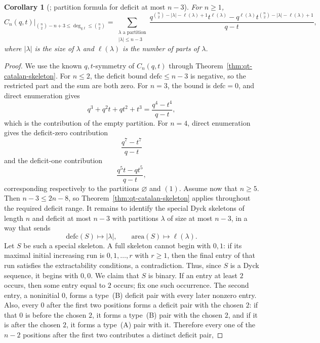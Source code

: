 \documentclass[11pt]{article}
\theoremstyle{plain}
\newtheorem{corollary}[theorem]{Corollary}
\theoremstyle{definition}
\theoremstyle{remark}
\newcommand{\area}{\mathrm{area}}
\newcommand{\defc}{\mathrm{defc}}
\begin{document}
\begin{corollary}[\cite{LeeLi2011}; partition formula for deficit at most \(n-3\)]
\label{cor:partition-formula}
For \(n\ge 1\),
\[
  \left.C_n(q,t)\right|_{\binom n2-n+3\le \deg_{q,t}\le \binom n2}
  =
  \sum_{\substack{\lambda\text{ a partition}\\ |\lambda|\le n-3}}
  \frac{q^{\binom n2-|\lambda|-\ell(\lambda)+1}t^{\ell(\lambda)}
        -q^{\ell(\lambda)}t^{\binom n2-|\lambda|-\ell(\lambda)+1}}{q-t},
\]
where \(|\lambda|\) is the size of \(\lambda\) and \(\ell(\lambda)\) is the
number of parts of \(\lambda\).
\end{corollary}
\begin{proof}
We use the known \(q,t\)-symmetry of \(C_n(q,t)\) through
Theorem~\ref{thm:qt-catalan-skeleton}.  For \(n\le 2\), the deficit bound
\(\defc\le n-3\) is negative, so the restricted part and the sum are both zero.
For \(n=3\), the bound is
\(\defc=0\), and direct enumeration gives
\[
  q^3+q^2t+qt^2+t^3=\frac{q^4-t^4}{q-t},
\]
which is the contribution of the empty partition.  For \(n=4\), direct
enumeration gives the deficit-zero contribution
\[
  \frac{q^7-t^7}{q-t}
\]
and the deficit-one contribution
\[
  \frac{q^5t-qt^5}{q-t},
\]
corresponding respectively to the partitions \(\varnothing\) and \((1)\).
Assume now that \(n\ge 5\).  Then \(n-3\le 2n-8\), so
Theorem~\ref{thm:qt-catalan-skeleton} applies throughout the required deficit
range.  It remains to identify the special Dyck skeletons of length \(n\) and
deficit at most \(n-3\) with partitions \(\lambda\) of size at most \(n-3\), in
a way that sends
\[
  \defc(S)\mapsto |\lambda|,
  \qquad
  \area(S)\mapsto \ell(\lambda).
\]
Let \(S\) be such a special skeleton.  A full skeleton cannot begin with
\(0,1\): if its maximal initial increasing run is
\(0,1,\ldots,r\) with \(r\ge 1\), then the final entry of that run satisfies the
extractability conditions, a contradiction.  Thus, since \(S\) is a Dyck
sequence, it begins with \(0,0\).
We claim that \(S\) is binary.  If an entry at least \(2\) occurs, then some
entry equal to \(2\) occurs; fix one such occurrence.  The second entry, a
noninitial \(0\), forms a type~\textup{(B)} deficit pair with every later
nonzero entry.  Also, every \(0\) after the first two positions forms a deficit
pair with the chosen \(2\): if that \(0\) is before the chosen \(2\), it forms
a type~\textup{(B)} pair with the chosen \(2\), and if it is after the chosen
\(2\), it forms a type~\textup{(A)} pair with it.  Therefore every one of the
\(n-2\) positions after the first two contributes a distinct deficit pair,

\end{proof}
\end{document}
